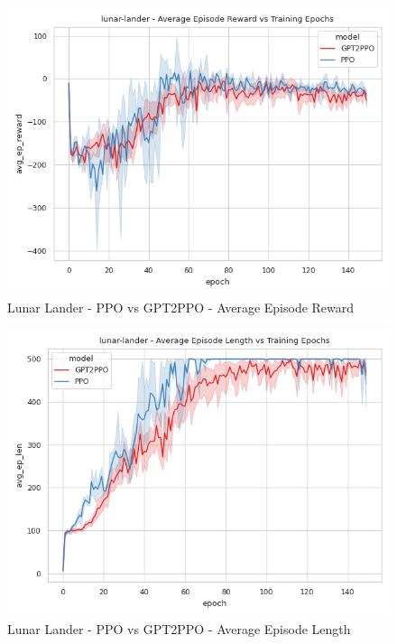 \begin{figure}[htbp]
    \centerline{\includegraphics[width=\columnwidth]{./img/lunar-lander-avg_ep_reward-model.png}}
    \caption{Lunar Lander - PPO vs GPT2PPO - Average Episode Reward}
    \label{lunar-lander-avg_ep_reward-model}
\end{figure}

\begin{figure}[htbp]
    \centerline{\includegraphics[width=\columnwidth]{./img/lunar-lander-avg_ep_len-model.png}}
    \caption{Lunar Lander - PPO vs GPT2PPO - Average Episode Length}
    \label{lunar-lander-avg_ep_len-model}
\end{figure}


